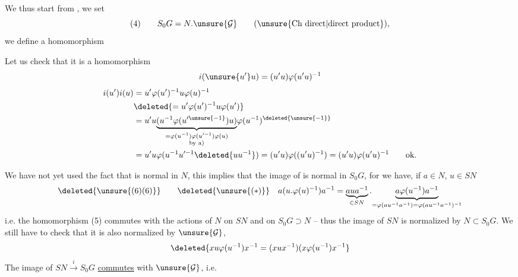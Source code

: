 
We thus start from , we set
\[
 (4)\qquad S_0G=N.\unsure{\mathcal G}\qquad(\text{\unsure{Ch direct|direct product}}),
\]
we define a homomorphism


Let us check that it is a homomorphism
\[
 i(\unsure{u'}u)=(u'u)\varphi(u'u)^{-1}
\]
\[
\begin{aligned}
 i(u')i(u)&=u'\varphi(u')^{-1}u\varphi(u)^{-1}\\
 &\deleted{=u'\varphi(u')^{-1}u\varphi(u')}\\
 &=u'u\underset{\substack{=\varphi(u^{-1})\varphi(u'^{-1})\varphi(u)\\\text{by a)}}}{\underbrace{(u^{-1}\varphi(u'^{\unsure{-1}})u)}}\varphi(u^{-1})^{\deleted{\unsure{-1}}}\\
 &=u'u\varphi(u^{-1}u'^{-1}\deleted{uu^{-1}})=(u'u)\varphi((u'u)^{-1})=(u'u)\varphi(u'u)^{-1}\qquad\text{ok.}
\end{aligned}
\]

We have not yet used the fact that is normal in $N$,  this implies that the image of  is normal in $S_0G$, for  we have, if $a\in N$, $u\in SN$
\[
 \deleted{\unsure{(6)(6)}}\qquad\deleted{\unsure{(*)}}\quad
 a(u.\varphi(u)^{-1})a^{-1}
 =\underbrace{aua^{-1}}_{\in SN}.\underset{=\varphi(au^{-1}a^{-1})=\varphi(au^{-1}a^{-1})^{-1}}{\underbrace{a\varphi(u^{-1})a^{-1}}}
\]
i.e. the homomorphism (5)  commutes with the actions of $N$ on $SN$ and on $S_0G\supset N$ -- thus the image of $SN$ is normalized by $N\subset S_0G$. We still have to check that it is also normalized by $\unsure{\mathcal G}$, 
\[
 \deleted{xu\varphi(u^{-1})x^{-1}=(xux^{-1})(x\varphi(u^{-1})x^{-1}}
\]
The image of $SN\xrightarrow{i}S_0G$ \uline{commutes} with $\unsure{\mathcal G}$, i.e.

